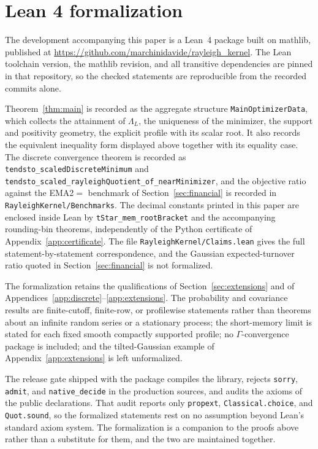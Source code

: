 \documentclass[11pt]{article}
\theoremstyle{definition}
\theoremstyle{remark}
\begin{document}
\section{Lean 4 formalization}\label{app:lean}
The development accompanying this paper is a Lean~4 package built on mathlib,
published at
\url{https://github.com/marchinidavide/rayleigh_kernel}. The Lean toolchain
version, the mathlib revision, and all transitive dependencies are pinned in
that repository, so the checked statements are reproducible from the recorded
commits alone.

Theorem~\ref{thm:main} is recorded as the aggregate structure
\texttt{MainOptimizerData}, which collects the attainment of $\Lambda_L$, the
uniqueness of the minimizer, the support and positivity geometry, the explicit
profile with its scalar root. It also records the equivalent inequality form
displayed above together with its equality case. \newline The discrete convergence theorem is recorded as \texttt{tendsto\_scaledDiscreteMinimum} and
\texttt{tendsto\_scaled\_rayleighQuotient\_of\_nearMinimizer}, and the
objective ratio against the EMA2$=$ benchmark of
Section~\ref{sec:financial} is recorded in
\texttt{RayleighKernel/Benchmarks}. The decimal constants printed in this paper
are enclosed inside Lean by \texttt{tStar\_mem\_rootBracket} and the
accompanying rounding-bin theorems, independently of the Python certificate of
Appendix~\ref{app:certificate}. The file
\texttt{RayleighKernel/Claims.lean} gives the full statement-by-statement
correspondence, and the Gaussian expected-turnover ratio quoted in
Section~\ref{sec:financial} is not formalized.

The formalization retains the qualifications of Section~\ref{sec:extensions} and
of Appendices~\ref{app:discrete}--\ref{app:extensions}. The probability and
covariance results are finite-cutoff, finite-row, or profilewise statements
rather than theorems about an infinite random series or a stationary process;
the short-memory limit is stated for each fixed smooth compactly supported
profile; no $\Gamma$-convergence package is included; and the tilted-Gaussian
example of Appendix~\ref{app:extensions} is left unformalized.

The release gate shipped with the package compiles the library, rejects
\texttt{sorry}, \texttt{admit}, and \texttt{native\_decide} in the production
sources, and audits the axioms of the public declarations. That audit reports
only \texttt{propext}, \texttt{Classical.choice}, and \texttt{Quot.sound}, so the
formalized statements rest on no assumption beyond Lean's standard axiom
system. The formalization is a companion to the proofs above rather than a
substitute for them, and the two are maintained together.
\end{document}
